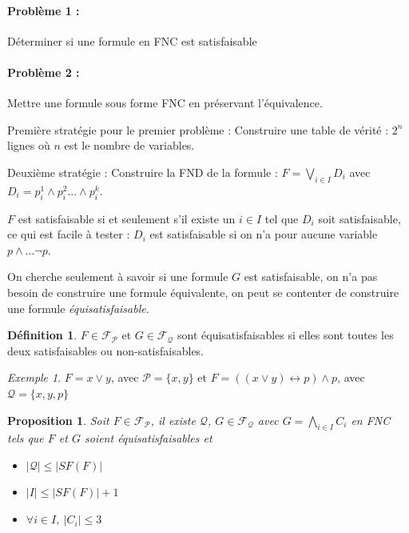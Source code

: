 \documentclass[]{article}
\newtheorem{myproposition}{Proposition}
\theoremstyle{remark}
\newtheorem{myexmpl}{Exemple}
\theoremstyle{definition}
\newtheorem{mydef}{Définition}
\begin{document}
\paragraph{Problème 1 :}
Déterminer si une formule en FNC est satisfaisable

\paragraph{Problème 2 :}
Mettre une formule sous forme FNC en préservant l'équivalence.

Première stratégie pour le premier problème : Construire une table de vérité : $2^n$ lignes où $n$ est le nombre de variables.

Deuxième stratégie : Construire la FND de la formule : $\displaystyle F = \bigvee_{i \in I} D_i$ avec $D_i = p_i^1 \land p_i^2 ... \land p_i^k$. 

$F$ est satisfaisable si et seulement s'il existe un $i \in I$ tel que $D_i$ soit satisfaisable, ce qui est facile à tester : $D_i$ est satisfaisable si on n'a pour aucune variable $p \land ... \neg p$.

On cherche seulement à savoir si une formule $G$ est satisfaisable, on n'a pas besoin de construire une formule équivalente, on peut se contenter de construire une formule \textit{équisatisfaisable}.

\begin{mydef}
	$F \in \mathcal{F}_{\mathcal{P}}$ et $G \in \mathcal{F}_{\mathcal{Q}}$ sont équisatisfaisables si elles sont toutes les deux satisfaisables ou non-satisfaisables.
\end{mydef}


\begin{myexmpl}
	$F = x \lor y$, avec $\mathcal{P} = \{x, y\}$ et $F = ((x \lor y) \leftrightarrow p) \land p$, avec $\mathcal{Q} = \{x, y, p\}$
\end{myexmpl}

\begin{myproposition}
	Soit $F \in \mathcal{F}_{\mathcal{P}}$, il existe $\mathcal{Q}$,  $G \in \mathcal{F}_{\mathcal{Q}}$ avec $\displaystyle G = \bigwedge_{i \in I}C_i$ en FNC tels que $F$ et $G$ soient équisatisfaisables et
	
	\begin{itemize}
		\item $|\mathcal{Q}| \leqslant |SF(F)|$
		\item $|I| \leqslant |SF(F)|+1$
		\item $\forall i \in I, ~ |C_i| \leqslant 3$
	\end{itemize}
\end{myproposition}
\end{document}
